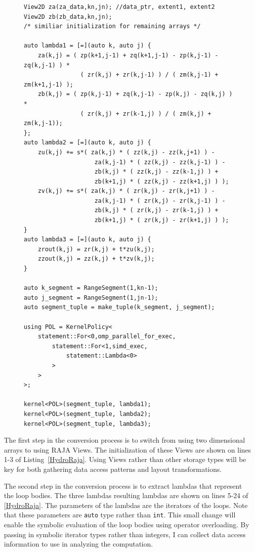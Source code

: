 \documentclass{article}
\begin{document}
\begin{figure}
    \begin{lstlisting}[caption={RAJA implementation of the \texttt{HYDRO\_2D} benchmark},label={HydroRaja}]
View2D za(za_data,kn,jn); //data_ptr, extent1, extent2
View2D zb(zb_data,kn,jn);
/* similiar initialization for remaining arrays */

auto lambda1 = [=](auto k, auto j) {
    za(k,j) = ( zp(k+1,j-1) + zq(k+1,j-1) - zp(k,j-1) - zq(k,j-1) ) *
                ( zr(k,j) + zr(k,j-1) ) / ( zm(k,j-1) + zm(k+1,j-1) ); 
    zb(k,j) = ( zp(k,j-1) + zq(k,j-1) - zp(k,j) - zq(k,j) ) * 
                ( zr(k,j) + zr(k-1,j) ) / ( zm(k,j) + zm(k,j-1));
};
auto lambda2 = [=](auto k, auto j) {
    zu(k,j) += s*( za(k,j) * ( zz(k,j) - zz(k,j+1) ) - 
                    za(k,j-1) * ( zz(k,j) - zz(k,j-1) ) - 
                    zb(k,j) * ( zz(k,j) - zz(k-1,j) ) + 
                    zb(k+1,j) * ( zz(k,j) - zz(k+1,j) ) ); 
    zv(k,j) += s*( za(k,j) * ( zr(k,j) - zr(k,j+1) ) - 
                    za(k,j-1) * ( zr(k,j) - zr(k,j-1) ) - 
                    zb(k,j) * ( zr(k,j) - zr(k-1,j) ) + 
                    zb(k+1,j) * ( zr(k,j) - zr(k+1,j) ) );
}
auto lambda3 = [=](auto k, auto j) {
    zrout(k,j) = zr(k,j) + t*zu(k,j); 
    zzout(k,j) = zz(k,j) + t*zv(k,j);
}

auto k_segment = RangeSegment(1,kn-1);
auto j_segment = RangeSegment(1,jn-1);
auto segment_tuple = make_tuple(k_segment, j_segment);
    
using POL = KernelPolicy<
    statement::For<0,omp_parallel_for_exec,
        statement::For<1,simd_exec,
            statement::Lambda<0>
        >
    >
>;

kernel<POL>(segment_tuple, lambda1);
kernel<POL>(segment_tuple, lambda2);
kernel<POL>(segment_tuple, lambda3);
\end{lstlisting}
\end{figure}

The first step in the conversion process is to switch from using two dimensional arrays to using RAJA Views.
The initialization of these Views are shown on lines 1-3 of Listing~\ref{HydroRaja}.
Using Views rather than other storage types will be key for both gathering data access patterns and layout transformations.

The second step in the conversion process is to extract lambdas that represent the loop bodies. 
The three lambdas resulting lambdas are shown on lines 5-24 of \autoref{HydroRaja}.
The parameters of the lambdas are the iterators of the loops.
Note that these parameters are \verb.auto. type rather than \verb.int..
This small change will enable the symbolic evaluation of the loop bodies using operator overloading.
By passing in symbolic iterator types rather than integers, I can collect data access information to use in analyzing the computation.
\end{document}
